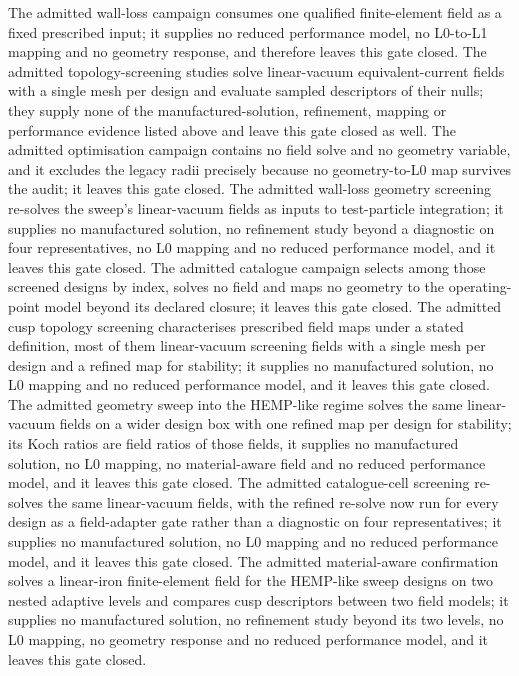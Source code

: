 \documentclass[11pt]{article}
\begin{document}
The admitted wall-loss campaign consumes one qualified finite-element field as
a fixed prescribed input; it supplies no reduced performance model, no
L0-to-L1 mapping and no geometry response, and therefore leaves this gate
closed. The admitted topology-screening studies solve linear-vacuum
equivalent-current fields with a single mesh per design and evaluate sampled
descriptors of their nulls; they supply none of the manufactured-solution,
refinement, mapping or performance evidence listed above and leave this gate
closed as well. The admitted optimisation campaign contains no field solve and
no geometry variable, and it excludes the legacy radii precisely because no
geometry-to-L0 map survives the audit; it leaves this gate closed. The admitted
wall-loss geometry screening re-solves the sweep's linear-vacuum fields as
inputs to test-particle integration; it supplies no manufactured solution, no
refinement study beyond a diagnostic on four representatives, no L0 mapping and
no reduced performance model, and it leaves this gate closed. The admitted
catalogue campaign selects among those screened designs by index, solves no
field and maps no geometry to the operating-point model beyond its declared
closure; it leaves this gate closed. The admitted cusp topology screening
characterises prescribed field maps under a stated definition, most of them
linear-vacuum screening fields with a single mesh per design and a refined map
for stability; it supplies no manufactured solution, no L0 mapping and no
reduced performance model, and it leaves this gate closed. The admitted geometry
sweep into the HEMP-like regime solves the same linear-vacuum fields on a wider
design box with one refined map per design for stability; its Koch ratios are
field ratios of those fields, it supplies no manufactured solution, no L0 mapping,
no material-aware field and no reduced performance model, and it leaves this gate
closed. The admitted catalogue-cell screening re-solves the same linear-vacuum
fields, with the refined re-solve now run for every design as a field-adapter
gate rather than a diagnostic on four representatives; it supplies no manufactured
solution, no L0 mapping and no reduced performance model, and it leaves this gate
closed. The admitted material-aware confirmation solves a linear-iron finite-element
field for the HEMP-like sweep designs on two nested adaptive levels and compares
cusp descriptors between two field models; it supplies no manufactured solution, no
refinement study beyond its two levels, no L0 mapping, no geometry response and no
reduced performance model, and it leaves this gate closed.
\end{document}
